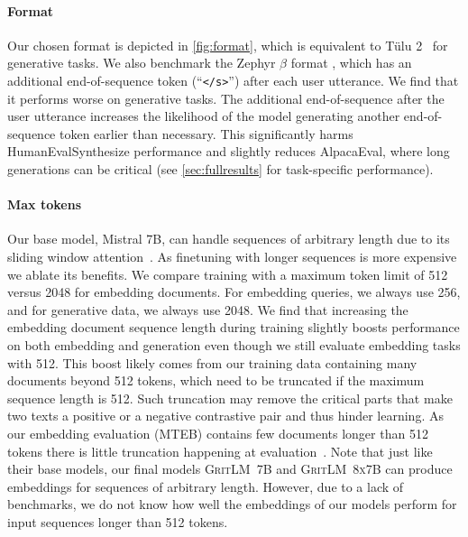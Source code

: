 \documentclass{article}
\newcommand{\modelbase}{\textsc{GritLM~7B}}
\newcommand{\modelbig}{\textsc{GritLM~8x7B}}
\newcommand{\tulu}{T\"ulu}
\begin{document}
\paragraph{Format} Our chosen format is depicted in \autoref{fig:format}, which is equivalent to \tulu{} 2~\cite{ivison2023camels} for generative tasks. We also benchmark the Zephyr $\beta$ format \cite{tunstall2023zephyr}, which has an additional end-of-sequence token (``\verb|</s>|'') after each user utterance. We find that it performs worse on generative tasks. The additional end-of-sequence after the user utterance increases the likelihood of the model generating another end-of-sequence token earlier than necessary. This significantly harms HumanEvalSynthesize performance and slightly reduces AlpacaEval, where long generations can be critical (see \autoref{sec:fullresults} for task-specific performance).


\paragraph{Max tokens} Our base model, Mistral 7B, can handle sequences of arbitrary length due to its sliding window attention~\cite{jiang2023mistral}. As finetuning with longer sequences is more expensive we ablate its benefits. We compare training with a maximum token limit of 512 versus 2048 for embedding documents. For embedding queries, we always use 256, and for generative data, we always use 2048. We find that increasing the embedding document sequence length during training slightly boosts performance on both embedding and generation even though we still evaluate embedding tasks with 512. This boost likely comes from our training data containing many documents beyond 512 tokens, which need to be truncated if the maximum sequence length is 512. Such truncation may remove the critical parts that make two texts a positive or a negative contrastive pair and thus hinder learning. As our embedding evaluation (MTEB) contains few documents longer than 512 tokens there is little truncation happening at evaluation~\cite{muennighoff2023mteb,günther2024jina,günther2023jina}. Note that just like their base models, our final models \modelbase{} and \modelbig{} can produce embeddings for sequences of arbitrary length. However, due to a lack of benchmarks, we do not know how well the embeddings of our models perform for input sequences longer than 512 tokens.
\end{document}
